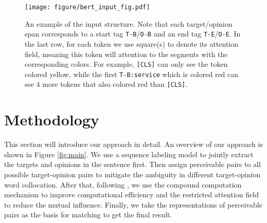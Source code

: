 \documentclass[11pt]{article}
\begin{document}
 \begin{table*}[t]
\centering
{}

\caption{Statistics of 4 datasets from ASTE-DATA-V2, where \textit{Sent.} denotes number of sentences, and \textit{Pos. Neu. Neg.} denote numbers of positive, neutral and negative triplets respectively.}
\label{tab:dataset}
\end{table*} \begin{figure*}[t]
    \centering
    \texttt{[image: figure/bert\_input\_fig.pdf]}
    \caption{An example of the input structure. Note that each target/opinion span corresponds to a start tag \texttt{T-B}/\texttt{O-B} and an end tag \texttt{T-E}/\texttt{O-E}. In the last row, for each token we use square(s) to denote its attention field, meaning this token will attention to the segments with the corresponding colors.
    For example, \texttt{[CLS]} can only see the token colored yellow, while the first \texttt{T-B:service} which is colored red can see 4 more tokens that also colored red than \texttt{[CLS]}.
    }
    \label{fig:bert}
\end{figure*} \section{Methodology}
This section will introduce our approach in detail. 
An overview of our approach is shown in Figure \ref{fig:main}.
We use a sequence labeling model to jointly extract the targets and opinions in the sentence first. Then assign perceivable pairs to all possible target-opinion pairs to mitigate the ambiguity in different target-opinion word collocation. After that, following \citet{zhong2020frustratingly}, we use the compound computation mechanism to improve computational efficiency and the restricted attention field to reduce the mutual influence.
Finally, we take the representations of perceivable pairs as the basis for matching to get the final result.
\end{document}

